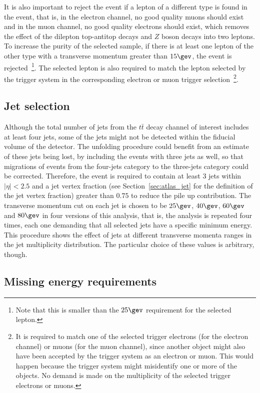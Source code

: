 It is also important to reject the event if a lepton of a different type is found in the event, that is, in the electron channel, no good quality muons
should exist and in the muon channel, no good quality electrons should exist,
which removes the effect of the dilepton top-antitop decays and $Z$ boson decays into two leptons. To increase the purity of the
selected sample, if there is at least one lepton of the other type with a transverse momentum greater than $15\gev$, the event is rejected~\footnote{Note that
this is smaller than the $25\gev$ requirement for the selected lepton.}.
The selected lepton is also required
to match the lepton selected
by the trigger system in the corresponding electron or muon trigger selection~\footnote{It is required to match one of the selected trigger electrons (for the electron channel)
or muons (for the muon channel),
since another object might also have been accepted by the trigger system as an electron or muon.
This would happen because the trigger system might misidentify one or more of the objects. No demand is made on the multiplicity of the selected trigger electrons or muons.}. 

\subsection{Jet selection}

Although the total number of jets from the $t\bar{t}$ decay channel of interest includes at least four jets, some of the jets
might not be detected within the fiducial volume of the detector. The unfolding procedure could benefit from an estimate
of these jets being lost, by including the events with three jets as well, so that migrations of events from the four-jets category to the three-jets
category could be corrected.
Therefore, the event is required to contain at least 3 jets within $|\eta| < 2.5$ and a jet vertex fraction (see Section~\ref{sec:atlas_jet} for the definition
of the jet vertex fraction) greater than $0.75$ to reduce the
pile up contribution. The transverse momentum cut on each jet is chosen to be $25\gev$, $40\gev$, $60\gev$ and $80\gev$ in four versions
of this analysis, that is, the analysis is repeated four times, each one demanding that all selected jets have a specific minimum energy.
This
procedure shows the effect of jets at different transverse momenta ranges in the jet multiplicity distribution.
The particular choice
of these values is arbitrary, though.

\subsection{Missing energy requirements}


